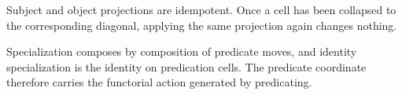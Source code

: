 \begin{proposition}\label{thm:subjproj-idem}\leanok{}
Subject and object projections are idempotent. Once a cell has been collapsed
to the corresponding diagonal, applying the same projection again changes
nothing.
\end{proposition}

\begin{theorem}\label{thm:specialize-comp}\leanok{}
Specialization composes by composition of predicate moves, and identity
specialization is the identity on predication cells. The predicate coordinate
therefore carries the functorial action generated by predicating.
\end{theorem}
